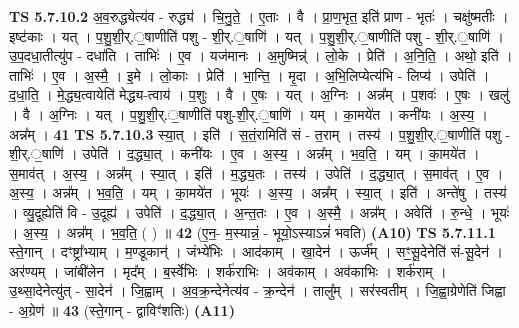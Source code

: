 \documentclass[17pt]{extarticle}
\begin{document}
                  \newline
                                \textbf{ TS 5.7.10.2} \newline
                  अ॒व॒रुद्ध्येत्य॑व - रुद्ध्य॑ । चि॒नु॒ते॒ । ए॒ताः । वै । प्रा॒ण॒भृत॒ इति॑ प्राण - भृतः॑ । चक्षु॑ष्मतीः । इष्ट॑काः । यत् । प॒शु॒शी॒र्.॒षाणीति॑ पशु - शी॒र्.॒षाणि॑ । यत् । प॒शु॒शी॒र्.॒षाणीति॑ पशु - शी॒र्.॒षाणि॑ । उ॒प॒दधा॒तीत्यु॑प - दधा॑ति । ताभिः॑ । ए॒व । यज॑मानः । अ॒मुष्मिन्न्॑ । लो॒के । प्रेति॑ । अ॒नि॒ति॒ । अथो॒ इति॑ । ताभिः॑ । ए॒व । अ॒स्मै॒ । इ॒मे । लो॒काः । प्रेति॑ । भा॒न्ति॒ । मृ॒दा । अ॒भि॒लिप्येत्य॑भि - लिप्य॑ । उपेति॑ । द॒धा॒ति॒ । मे॒द्ध्य॒त्वायेति॑ मेद्ध्य-त्वाय॑ । प॒शुः । वै । ए॒षः । यत् । अ॒ग्निः । अन्न᳚म् । प॒शवः॑ । ए॒षः । खलु॑ । वै । अ॒ग्निः । यत् । प॒शु॒शी॒र्.॒षाणीति॑ पशु-शी॒र्.॒षाणि॑ । यम् । का॒मये॑त । कनी॑यः । अ॒स्य॒ । अन्न᳚म् । \textbf{  41} \newline
                  \newline
                                \textbf{ TS 5.7.10.3} \newline
                  स्या॒त् । इति॑ । स॒तं॒रामिति॑ सं - त॒राम् । तस्य॑ । प॒शु॒शी॒र्.॒षाणीति॑ पशु - शी॒र्.॒षाणि॑ । उपेति॑ । द॒द्ध्या॒त् । कनी॑यः । ए॒व । अ॒स्य॒ । अन्न᳚म् । भ॒व॒ति॒ । यम् । का॒मये॑त । स॒माव॑त् । अ॒स्य॒ । अन्न᳚म् । स्या॒त् । इति॑ । म॒द्ध्य॒तः । तस्य॑ । उपेति॑ । द॒द्ध्या॒त् । स॒माव॑त् । ए॒व । अ॒स्य॒ । अन्न᳚म् । भ॒व॒ति॒ । यम् । का॒मये॑त । भूयः॑ । अ॒स्य॒ । अन्न᳚म् । स्या॒त् । इति॑ । अन्ते॑षु । तस्य॑ । व्यु॒दूह्येति॑ वि - उ॒दूह्य॑ । उपेति॑ । द॒द्ध्या॒त् । अ॒न्त॒तः । ए॒व । अ॒स्मै॒ । अन्न᳚म् । अवेति॑ । रु॒न्धे॒ । भूयः॑ । अ॒स्य॒ । अन्न᳚म् । भ॒व॒ति॒ ( ) ॥ \textbf{  42 } \newline
                  \newline
                      (ए॒न॒- म॒स्यान्नं॒ - भूयो॒ऽस्याऽन्नं॑ भवति)  \textbf{(A10)} \newline \newline
                                \textbf{ TS 5.7.11.1} \newline
                  स्ते॒गान् । दꣳष्ट्रा᳚भ्याम् । म॒ण्डूकान्॑ । जंभ्ये॑भिः । आद॑काम् । खा॒देन॑ । ऊर्ज᳚म् । सꣳ॒॒सू॒देनेति॑ सं-सू॒देन॑ । अर॑ण्यम् । जांबी॑लेन । मृद᳚म् । ब॒र्स्वे॑भिः । शर्क॑राभिः । अव॑काम् । अव॑काभिः । शर्क॑राम् । उ॒थ्सा॒देनेत्यु॑त् - सा॒देन॑ । जि॒ह्वाम् । अ॒व॒क्र॒न्देनेत्य॑व - क्र॒न्देन॑ । तालु᳚म् । सर॑स्वतीम् । जि॒ह्वा॒ग्रेणेति॑ जिह्वा - अ॒ग्रेण॑ ॥ \textbf{  43 } \newline
                  \newline
                      (स्ते॒गान् - द्वाविꣳ॑शतिः)  \textbf{(A11)} \newline \newline
\end{document}
